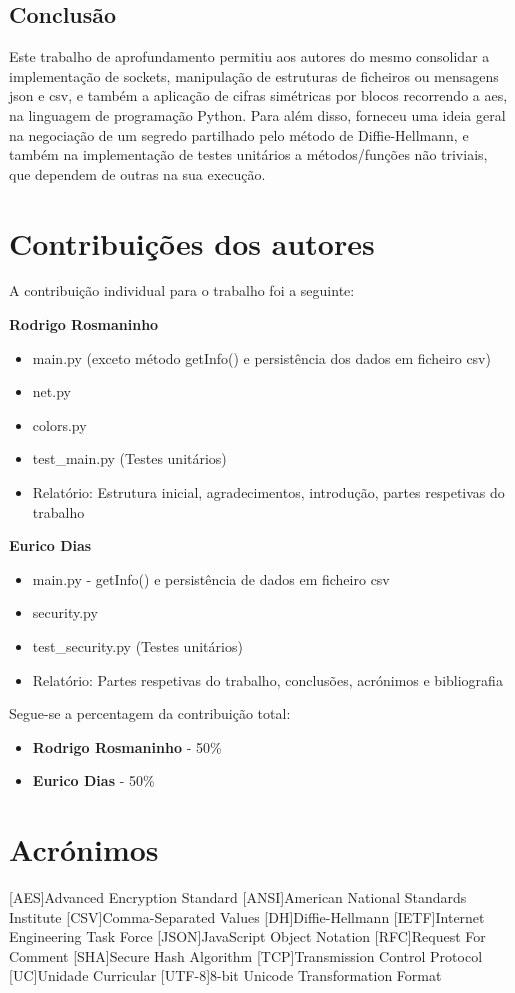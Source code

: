 \documentclass{report}
\begin{document}
\section{Conclusão}
Este trabalho de aprofundamento permitiu aos autores do mesmo consolidar a implementação de sockets, manipulação de estruturas de ficheiros ou mensagens \ac{json} e \ac{csv}, e também a aplicação de cifras simétricas por blocos recorrendo a \ac{aes}, na linguagem de programação Python. Para além disso, forneceu uma ideia geral na negociação de um segredo partilhado pelo método de Diffie-Hellmann, e também na implementação de testes unitários a métodos/funções não triviais, que dependem de outras na sua execução.

\chapter*{Contribuições dos autores}
A contribuição individual para o trabalho foi a seguinte:

\textbf{Rodrigo Rosmaninho}
\begin{itemize}
\item main.py (exceto método getInfo() e persistência dos dados em ficheiro \ac{csv})
\item net.py
\item colors.py
\item test\_main.py (Testes unitários)
\item Relatório: Estrutura inicial, agradecimentos, introdução, partes respetivas do trabalho
\end{itemize}

\textbf{Eurico Dias}
\begin{itemize}
\item main.py - getInfo() e persistência de dados em ficheiro \ac{csv}
\item security.py
\item test\_security.py (Testes unitários)
\item Relatório: Partes respetivas do trabalho, conclusões, acrónimos e bibliografia
\end{itemize}
Segue-se a percentagem da contribuição total:
\begin{itemize}
\item \textbf{Rodrigo Rosmaninho} - 50\%
\item \textbf{Eurico Dias} - 50\%
\end{itemize}

\chapter*{Acrónimos}
\begin{acronym}
[AES]{Advanced Encryption Standard}
[ANSI]{American National Standards Institute}
[CSV]{Comma-Separated Values}
[DH]{Diffie-Hellmann}
[IETF]{Internet Engineering Task Force}
[JSON]{JavaScript Object Notation}
[RFC]{Request For Comment}
[SHA]{Secure Hash Algorithm}
[TCP]{Transmission Control Protocol}
[UC]{Unidade Curricular}
[UTF-8]{8-bit Unicode Transformation Format}
\end{acronym}


\printbibliography
\end{document}
